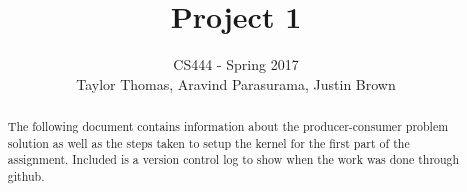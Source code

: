 \documentclass[draftclsnofoot,onecolumn,10pt,compsoc]{IEEEtran}
\begin{document}
\begin{titlepage}
\title{Project 1}
\author{CS444 - Spring 2017 \\ Taylor Thomas, Aravind Parasurama, Justin Brown}
\maketitle
\begin{abstract}
The following document contains information about the producer-consumer problem
solution as well as the steps taken to setup the kernel for the first part of
the assignment. Included is a version control log to show when the work was done
through github.  
\end{abstract}

\thispagestyle{empty} %

\end{titlepage}

\tableofcontents

\newpage
\end{document}
